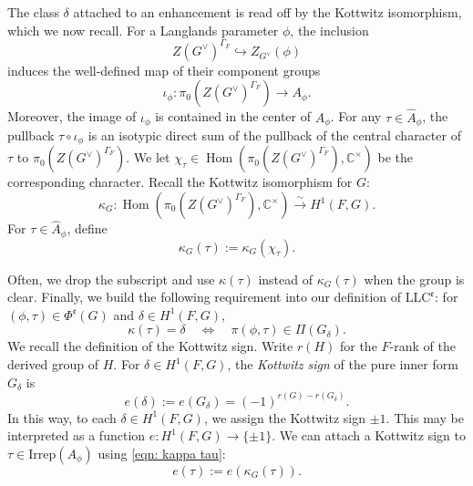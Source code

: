 \documentclass[11pt,letterpaper]{amsart}
\newcommand{\BC}{\mathbb{C}}
\newcommand{\dualgroup}[1]{{#1}^\vee}
\newcommand{\irrepdual}[1]{\widehat{#1}}
\newcommand{\LLC}{\mathrm{LLC}}
\newcommand{\Irrep}{\mathrm{Irrep}}
\DeclareMathOperator{\Hom}{Hom}
\renewcommand{\1}{\mathbbm{1}}
\numberwithin{equation}{section}
\begin{document}
{The class $\delta$ attached to an enhancement is read off by the Kottwitz isomorphism, which we now recall. For a Langlands parameter $\phi$, the inclusion
\[Z(\dualgroup{G})^{\Gamma_F} \hookrightarrow Z_{\dualgroup{G}}(\phi)\] { induces the well-defined map of their component groups}
\begin{equation}\label{equation: inclusion of componenet grp of center in a phi}
    \iota_\phi: \pi_0(Z(\dualgroup{G})^{\Gamma_F}) \to A_\phi.
\end{equation}
Moreover, the image of $\iota_\phi$ is contained in the center of $A_\phi$. For any $\tau \in \irrepdual{A}_\phi$, the pullback $\tau \circ \iota_\phi$ is an isotypic direct sum of the pullback of the central character of $\tau$ to $\pi_0(Z(\dualgroup{G})^{\Gamma_F})$. We let $\chi_{\tau} \in \Hom(\pi_0(Z(\dualgroup{G})^{\Gamma_F}), \BC^\times)$ be the corresponding character. Recall the Kottwitz isomorphism for $G$:
\begin{equation}\label{eqn: kottwitz map}
    \kappa_G: \Hom(\pi_0(Z(\dualgroup{G})^{\Gamma_F}), \BC^\times) \xrightarrow[]{\sim} H^1(F,G).
\end{equation}
For $\tau \in \irrepdual{A}_\phi$, define 
\begin{equation}\label{eqn: kappa tau}
    \kappa_G(\tau):=\kappa_G(\chi_{\tau}).
\end{equation}

Often, we drop the subscript and use $\kappa(\tau)$ instead of $\kappa_G(\tau)$ when the group is clear. Finally, we build the following requirement into our definition of $\LLC^{\mathfrak{e}}$: for $(\phi,\tau)\in \Phi^{\mathfrak{e}}(G)$ and $\delta \in H^1(F,G)$,
\begin{equation}\label{equation: kappa determines the form}
    \kappa(\tau)=\delta \quad \Longleftrightarrow \quad \pi(\phi,\tau)\in \Pi(G_\delta).
\end{equation} We recall the definition of the Kottwitz sign.
Write $r(H)$ for the $F$-rank of the derived group of $H$. For $\delta \in H^1(F,G)$, the \emph{Kottwitz sign} of the pure inner form $G_\delta$ is
\begin{equation}\label{equation: kottwitz sign}
    e(\delta):= e(G_\delta)=(-1)^{r(G)-r(G_\delta)}.
\end{equation}
In this way, to each $\delta \in H^1(F,G)$, we assign the Kottwitz sign $\pm 1$. This may be interpreted as a function $e:H^1(F,G)\to \{\pm 1\}$. We can attach a Kottwitz sign to $\tau \in \Irrep(A_\phi)$ using \eqref{eqn: kappa tau}:
\begin{equation}\label{equation: kottwitz sign of tau}
    e(\tau):=e(\kappa_G(\tau)).
\end{equation}

}
\end{document}
